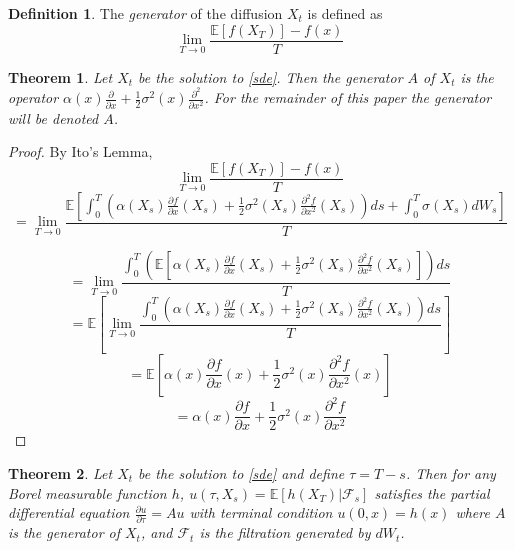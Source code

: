 \documentclass{article}
\newtheorem{theorem}{Theorem}
\theoremstyle{definition}
\newtheorem{definition}{Definition}
\begin{document}
\begin{definition}
	The \emph{generator} of the diffusion \(X_t\) is defined as 
	\[\lim_{T \to 0} \frac{\mathbb{E}[f(X_T)]-f(x)}{T} \]
\end{definition}

\begin{theorem}
Let \(X_t\) be the solution to \ref{sde}.  Then the generator \(A\) of \(X_t\) is the operator \(\alpha(x) \frac{\partial}{\partial x} +\frac{1}{2} \sigma^2(x) \frac{\partial ^2}{\partial x^2} \).  For the remainder of this paper the generator will be denoted \(A\).  

\end{theorem}

\begin{proof}
	By Ito's Lemma,
	\[\lim_{T \to 0} \frac{\mathbb{E}[f(X_T)]-f(x)}{T}\]
	\[=\lim_{T \to 0} \frac{\mathbb{E}\left[ \int_0 ^ T \left( \alpha(X_s) \frac{\partial f}{\partial x}(X_s) +\frac{1}{2} \sigma^2(X_s) \frac{\partial^2 f}{\partial x^2}(X_s) \right) ds + \int_0^T \sigma(X_s)dW_s \right]}{T} \]
	
	\[ = \lim_{T \to 0} \frac{ \int_0 ^ T \left( \mathbb{E}\left[\alpha(X_s) \frac{\partial f}{\partial x}(X_s) +\frac{1}{2} \sigma^2(X_s) \frac{\partial^2 f}{\partial x^2}(X_s) \right] \right) ds  }{T} \]
	\[ = \mathbb{E}\left[\lim_{T \to 0} \frac{ \int_0 ^ T \left( \alpha(X_s) \frac{\partial f}{\partial x}(X_s) +\frac{1}{2} \sigma^2(X_s) \frac{\partial^2 f}{\partial x^2}(X_s)  \right) ds }{T} \right]  \]
	\[ = \mathbb{E}\left[\alpha(x) \frac{\partial f}{\partial x} (x) +\frac{1}{2} \sigma^2(x) \frac{\partial^2 f}{\partial x^2}(x) \right] \]
	\[ = \alpha(x) \frac{\partial f}{\partial x} +\frac{1}{2} \sigma^2(x) \frac{\partial^2 f}{\partial x^2}\]
	
\end{proof}

\begin{theorem}\label{fk}
	Let \(X_t\) be the solution to \ref{sde} and define \(\tau=T-s\).  Then for any Borel measurable function \(h\),
	\(u(\tau, X_s)=\mathbb{E}[h(X_T)|\mathcal{F}_s]\) satisfies the partial differential equation
	\(\frac{\partial u}{\partial \tau} = Au \) with terminal condition \(u(0, x)=h(x)\)
	where \(A\) is the generator of \(X_t\),  and \(\mathcal{F}_t\) is the filtration generated by \(dW_t\).
	
\end{theorem}
\end{document}
